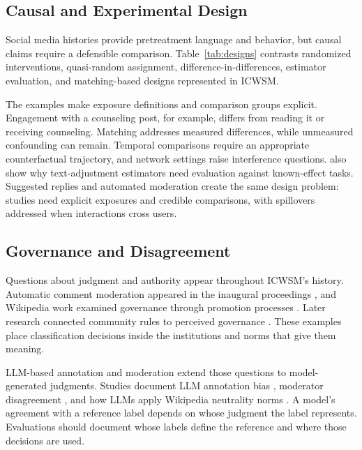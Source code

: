 \subsection{Causal and Experimental Design}
\label{sec:causal}
Social media histories provide pretreatment language and behavior, but causal claims require a defensible comparison. Table~\ref{tab:designs} contrasts randomized interventions, quasi-random assignment, difference-in-differences, estimator evaluation, and matching-based designs represented in ICWSM.



The examples make exposure definitions and comparison groups explicit. Engagement with a counseling post, for example, differs from reading it or receiving counseling. Matching addresses measured differences, while unmeasured confounding can remain. Temporal comparisons require an appropriate counterfactual trajectory, and network settings raise interference questions. \citet{p19362} also show why text-adjustment estimators need evaluation against known-effect tasks. Suggested replies and automated moderation create the same design problem: studies need explicit exposures and credible comparisons, with spillovers addressed when interactions cross users.

\subsection{Governance and Disagreement}
Questions about judgment and authority appear throughout ICWSM's history. Automatic comment moderation appeared in the inaugural proceedings \citep{icwsm2007_paper59}, and Wikipedia work examined governance through promotion processes \citep{p14013}. Later research connected community rules to perceived governance \citep{p15033}. These examples place classification decisions inside the institutions and norms that give them meaning.

LLM-based annotation and moderation extend those questions to model-generated judgments. Studies document LLM annotation bias \citep{p35879}, moderator disagreement \citep{p42625}, and how LLMs apply Wikipedia neutrality norms \citep{p42630}. A model's agreement with a reference label depends on whose judgment the label represents. Evaluations should document whose labels define the reference and where those decisions are used.

